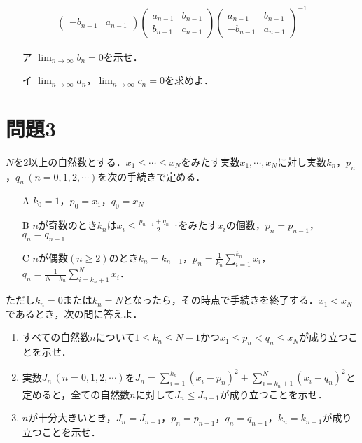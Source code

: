 \documentclass[unicode,12pt, A4j]{ltjsarticle}%
\begin{document}
\begin{enumerate}
\begin{align}
\begin{pmatrix}
             -b_{n-1} & a_{n-1}
	\end{pmatrix}
	\begin{pmatrix}
             a_{n-1} & b_{n-1} \\
             b_{n-1} & c_{n-1}
	\end{pmatrix}
	\begin{pmatrix}
             a_{n-1} & b_{n-1} \\
             -b_{n-1} & a_{n-1}
	\end{pmatrix}^{-1}
       \end{align}
       \begin{itemize}
	\item[ア] $\lim_{n\to\infty}b_n=0$を示せ．
	\item[イ] $\lim_{n\to\infty}a_n$，$\lim_{n\to\infty}c_n=0$を求めよ．
       \end{itemize}
\end{enumerate}


\section{問題3}
$N$を$2$以上の自然数とする．$x_1\le \cdots \le x_N$をみたす実数$x_1,\cdots,x_N$に対し実数$k_n$，$p_n$，$q_n\, (n=0,1,2,\cdots)$を次の手続きで定める．
\begin{itemize}
 \item[A] $k_0=1$，$p_0=x_1$，$q_0=x_N$
 \item[B] $n$が奇数のとき$k_n$は$x_i\le \frac{p_{n-1}+q_{n-1}}{2}$をみたす$x_i$の個数，$p_n=p_{n-1}$，$q_n=q_{n-1}$
 \item[C] $n$が偶数$(n\ge 2)$のとき$k_n=k_{n-1}$，$p_n=\frac{1}{k_n}\sum_{i=1}^{k_n}x_i$，$q_n=\frac{1}{N-k_n}\sum_{i=k_n+1}^{N}x_i$．
\end{itemize}
ただし$k_n=0$または$k_n=N$となったら，その時点で手続きを終了する．$x_1<x_N$であるとき，次の問に答えよ．
\begin{enumerate}
 \item すべての自然数$n$について$1\le k_n\le N-1$かつ$x_1\le p_n<q_n\le x_N$が成り立つことを示せ．
 \item 実数$J_n\,(n=0,1,2,\cdots)$を$J_n=\sum_{i=1}^{k_n}(x_i-p_n)^2+\sum_{i=k_n+1}^{N}(x_i-q_n)^2$と定めると，全ての自然数$n$に対して$J_n\le J_{n-1}$が成り立つことを示せ．
 \item $n$が十分大きいとき，$J_n=J_{n-1}$，$p_n=p_{n-1}$，$q_n=q_{n-1}$，$k_n=k_{n-1}$が成り立つことを示せ．
\end{enumerate}
\end{document}
